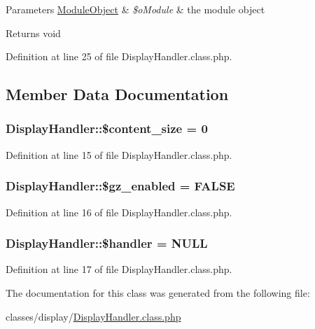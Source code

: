 \begin{DoxyParams}[1]{Parameters}
\hyperlink{classModuleObject}{Module\+Object} & {\em \$o\+Module} & the module object \\
\hline
\end{DoxyParams}
\begin{DoxyReturn}{Returns}
void 
\end{DoxyReturn}


Definition at line 25 of file Display\+Handler.\+class.\+php.



\subsection{Member Data Documentation}
\hypertarget{classDisplayHandler_a16976f3c3f4d8e587c113278731a5562}{}
\subsubsection[{\$content\+\_\+size}]{\setlength{\rightskip}{0pt plus 5cm}Display\+Handler\+::\$content\+\_\+size = 0}\label{classDisplayHandler_a16976f3c3f4d8e587c113278731a5562}


Definition at line 15 of file Display\+Handler.\+class.\+php.

\hypertarget{classDisplayHandler_a15d342938e38ae003b61d9437a43d3dc}{}
\subsubsection[{\$gz\+\_\+enabled}]{\setlength{\rightskip}{0pt plus 5cm}Display\+Handler\+::\$gz\+\_\+enabled = F\+A\+L\+S\+E}\label{classDisplayHandler_a15d342938e38ae003b61d9437a43d3dc}


Definition at line 16 of file Display\+Handler.\+class.\+php.

\hypertarget{classDisplayHandler_a5bba2765a13e36d9e147424338fb2a92}{}
\subsubsection[{\$handler}]{\setlength{\rightskip}{0pt plus 5cm}Display\+Handler\+::\$handler = N\+U\+L\+L}\label{classDisplayHandler_a5bba2765a13e36d9e147424338fb2a92}


Definition at line 17 of file Display\+Handler.\+class.\+php.



The documentation for this class was generated from the following file\+:\begin{DoxyCompactItemize}
\item 
classes/display/\hyperlink{DisplayHandler_8class_8php}{Display\+Handler.\+class.\+php}\end{DoxyCompactItemize}
